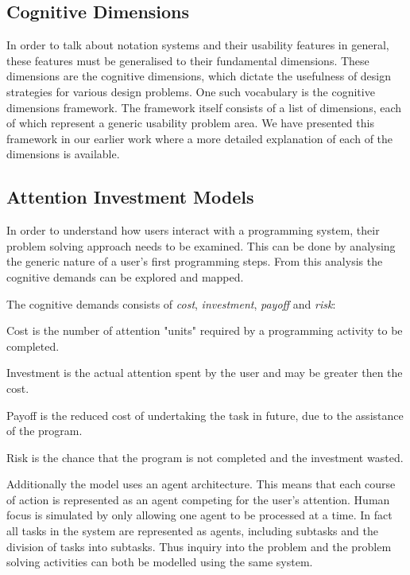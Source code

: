 \subsection{Cognitive Dimensions} \label{sec:cog-dim}
In order to talk about notation systems and their usability features in general, these features must be generalised to their fundamental dimensions. These dimensions are the cognitive dimensions, which dictate the usefulness of design strategies for various design problems. One such vocabulary is the cognitive dimensions framework\cite{green1996usability}. The framework itself consists of a list of dimensions, each of which represent a generic usability problem area.
We have presented this framework in our earlier work where a more detailed explanation of each of the dimensions is available\cite{p92018gameplay}.

\subsection{Attention Investment Models} \label{sec:attention-investment}
In order to understand how users interact with a programming system, their problem solving approach needs to be examined. This can be done by analysing the generic nature of a user's first programming steps. From this analysis the cognitive demands can be explored and mapped\cite{blackwell2002first}.

The cognitive demands consists of \textit{cost}, \textit{investment}, \textit{payoff} and \textit{risk}:
\begin{labeling}{\quad\quad}
    \item[Cost] is the number of attention "units" required by a programming activity to be completed.
    \item[Investment] is the actual attention spent by the user and may be greater then the cost.
    \item[Payoff] is the reduced cost of undertaking the task in future, due to the assistance of the program.
    \item[Risk] is the chance that the program is not completed and the investment wasted.
\end{labeling}

Additionally the model uses an agent architecture. This means that each course of action is represented as an agent competing for the user's attention. Human focus is simulated by only allowing one agent to be processed at a time. In fact all tasks in the system are represented as agents, including subtasks and the division of tasks into subtasks. Thus inquiry into the problem and the problem solving activities can both be modelled using the same system.

